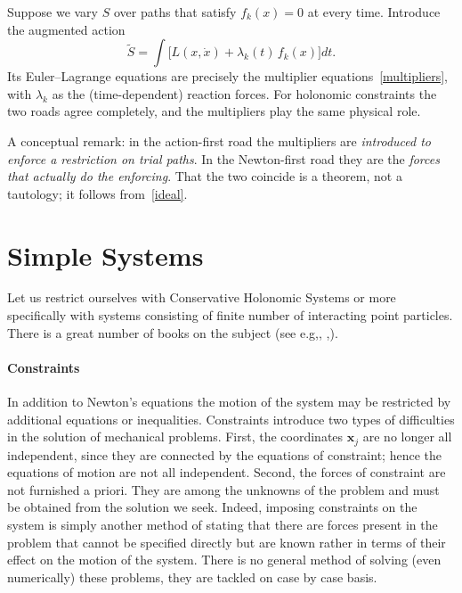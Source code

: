 Suppose we vary $S$ over paths that satisfy $f_k(x)=0$ at every time.
Introduce the augmented action
\begin{equation}
  \tilde S=\int\bigl[L(x,\dot x)+\lambda_k(t)\,f_k(x)\bigr]dt .
  \label{aug-holonomic}
\end{equation}
Its Euler--Lagrange equations are precisely the multiplier
equations~\eqref{multipliers}, with $\lambda_k$ as the (time-dependent)
reaction forces. For holonomic constraints the two roads agree completely, and
the multipliers play the same physical role.

A conceptual remark: in the action-first road the multipliers are
\emph{introduced to enforce a restriction on trial paths}. In the Newton-first
road they are the \emph{forces that actually do the enforcing}. That the two
coincide is a theorem, not a tautology; it follows from~\eqref{ideal}.








\section{Simple Systems}
\label{chs:ss}

Let us restrict ourselves with Conservative Holonomic Systems or
more specifically with systems consisting of finite number of
interacting point particles.
There is a great number of books on the subject
(see e.g\cite{Arnold-cm},\cite{Landau-Lifshitz-1},
\cite{Lanczos},\cite{Goldstein}). 


\paragraph{Constraints} 

In addition to Newton's equations the motion of the system may be restricted by
additional equations or inequalities. Constraints introduce two types of
difficulties in the solution of mechanical problems. First, the coordinates
$\bm x_j$ are no longer all independent, since they are connected by the
equations of constraint; hence the equations of motion  are not all
independent. Second, the forces of constraint  are not furnished a priori. They
are among the unknowns of the problem and must be obtained from the solution we
seek. Indeed, imposing constraints on the system  is simply another method of
stating that there are forces present in the problem that cannot be specified
directly but are known rather in terms of their effect on the motion of the
system. There is no general method of solving (even numerically) these
problems, they are tackled on case by case basis.

